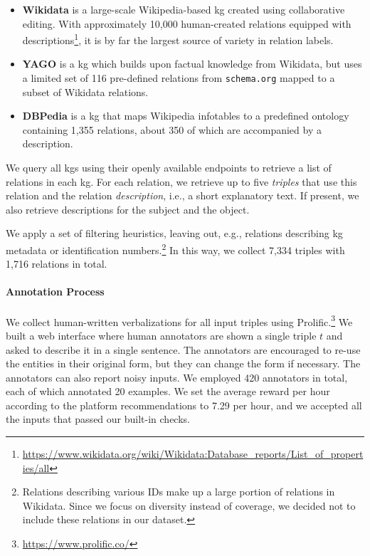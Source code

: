 \begin{itemize}
    \item \textbf{Wikidata} \cite{vrandevcic2014wikidata} is a large-scale Wikipedia-based \ac{kg} created using collaborative editing. With approximately 10,000 human-created relations equipped with descriptions\footnote{\url{https://www.wikidata.org/wiki/Wikidata:Database_reports/List_of_properties/all}}, it is by far the largest source of variety in relation labels.
    \item \textbf{YAGO} \cite{pellissier2020yago} is a \ac{kg} which builds upon factual knowledge from Wikidata, but uses a limited set of 116 pre-defined relations from \texttt{schema.org} \cite{guha2016schema} mapped to a subset of Wikidata relations.
    \item \textbf{DBPedia} \cite{auer2007dbpedia,lehmann2015dbpedia} is a \ac{kg} that maps Wikipedia infotables to a predefined ontology containing 1,355 relations, about 350 of which are accompanied by a description.
\end{itemize}

We query all \acp{kg} using their openly available endpoints to retrieve a list of relations in each \ac{kg}. For each relation, we retrieve up to five \textit{triples} that use this relation and the relation \textit{description}, i.e., a short explanatory text.
If present, we also retrieve descriptions for the subject and the object.

We apply a set of filtering heuristics, leaving out, e.g., relations describing \ac{kg} metadata or identification numbers.\footnote{Relations describing various IDs make up a large portion of relations in Wikidata. Since we focus on diversity instead of coverage, we decided not to include these relations in our dataset.} In this way, we collect 7,334 triples with 1,716 relations in total.

\paragraph{Annotation Process}
We collect human-written verbalizations for all input triples using Prolific.\footnote{\url{https://www.prolific.co/}} We built a web interface where human annotators are shown a single triple $t$ and asked to describe it in a single sentence. The annotators are encouraged to re-use the entities in their original form, but they can change the form if necessary. The annotators can also report noisy inputs. We employed 420 annotators in total, each of which annotated 20 examples. We set the average reward per hour according to the platform recommendations to  \textsterling{}7.29 per hour, and we accepted all the inputs that passed our built-in checks.

